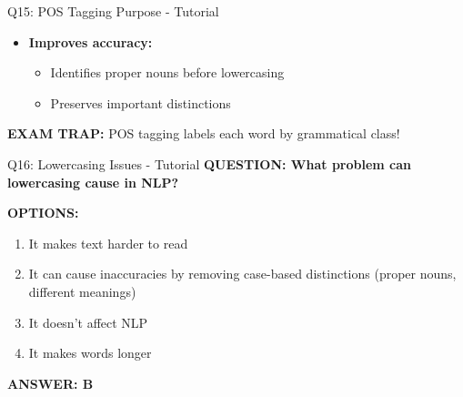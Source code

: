 \documentclass[8pt]{beamer}
\begin{document}
\begin{frame}{Q15: POS Tagging Purpose - Tutorial}
\begin{itemize}
\begin{itemize}
			\item \textbf{Improves accuracy:}
			\begin{itemize}
				\item Identifies proper nouns before lowercasing
				\item Preserves important distinctions
			\end{itemize}
		\end{itemize}
	\end{itemize}
	
	\textcolor{myred}{\textbf{EXAM TRAP:}} POS tagging labels
	\textcolor{myblue}{each word by grammatical class}!
\end{frame}





	
	\begin{frame}{Q16: Lowercasing Issues - Tutorial}
		\fontsize{6.5}{7.5}\selectfont
		\textbf{QUESTION: What problem can lowercasing cause in NLP?}
		
		\vspace{0.1cm}
		\textbf{OPTIONS:}
		\begin{enumerate}
			\item It makes text harder to read
			\item It can cause inaccuracies by removing case-based distinctions (proper nouns, different meanings)
			\item It doesn't affect NLP
			\item It makes words longer
		\end{enumerate}
		
		\vspace{0.1cm}
		\textcolor{myblue}{\textbf{ANSWER: B}}
		

\end{frame}
\end{document}
